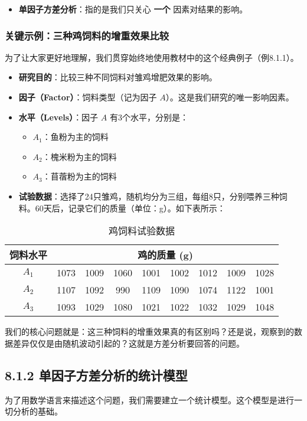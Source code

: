 \documentclass[12pt, a4paper]{amsart}
\begin{document}
\begin{itemize}
    \item \textbf{单因子方差分析}：指的是我们只关心 \textbf{一个} 因素对结果的影响。
\end{itemize}

\subsubsection{关键示例：三种鸡饲料的增重效果比较}
为了让大家更好地理解，我们贯穿始终地使用教材中的这个经典例子（例8.1.1）。

\begin{itemize}
    \item \textbf{研究目的}：比较三种不同饲料对雏鸡增肥效果的影响。
    \item \textbf{因子（Factor）}：饲料类型（记为因子 $A$）。这是我们研究的唯一影响因素。
    \item \textbf{水平（Levels）}：因子 $A$ 有3个水平，分别是：
    \begin{itemize}
        \item $A_1$：鱼粉为主的饲料
        \item $A_2$：槐米粉为主的饲料
        \item $A_3$：苜蓿粉为主的饲料
    \end{itemize}
    \item \textbf{试验数据}：选择了24只雏鸡，随机均分为三组，每组8只，分别喂养三种饲料。60天后，记录它们的质量（单位：g）。如下表所示：
\end{itemize}

\begin{table}[h!]
\centering
\caption{鸡饲料试验数据}
\begin{tabular}{ccccccccc}
\toprule
\textbf{饲料水平} & \multicolumn{8}{c}{\textbf{鸡的质量 (g)}} \\
\midrule
$A_1$ & 1073 & 1009 & 1060 & 1001 & 1002 & 1012 & 1009 & 1028 \\
$A_2$ & 1107 & 1092 & 990 & 1109 & 1090 & 1074 & 1122 & 1001 \\
$A_3$ & 1093 & 1029 & 1080 & 1021 & 1022 & 1032 & 1029 & 1048 \\
\bottomrule
\end{tabular}
\end{table}

我们的核心问题就是：这三种饲料的增重效果真的有区别吗？还是说，观察到的数据差异仅仅是由随机波动引起的？这就是方差分析要回答的问题。

\subsection{8.1.2 单因子方差分析的统计模型}
为了用数学语言来描述这个问题，我们需要建立一个统计模型。这个模型是进行一切分析的基础。
\end{document}
